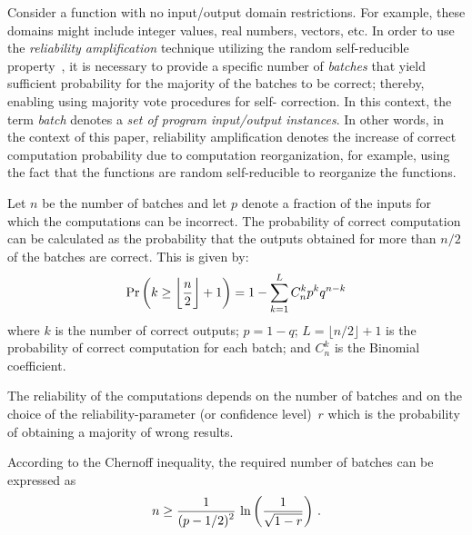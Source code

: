 \begin{multicols}{2}
     Consider a function with no input/output domain restrictions. For example, these domains might include integer 
values, real numbers, vectors, etc. In order to use the \textit{reliability amplification} technique 
utilizing the random 
self-reducible property~\cite{3-dol, 6-dol}, it is necessary to provide a specific number of 
\textit{batches} that yield sufficient 
probability for the majority of the batches to be correct; thereby, enabling using majority vote procedures for self-
correction. In this context, the term \textit{batch} denotes a
\textit{set of program input/output instances}.
In other words, in the context of this paper, reliability amplification denotes the increase of correct 
computation probability due to computation reorganization, for example, using the fact that the functions are random 
self-reducible to reorganize the functions.
       
       Let $n$ be the number of batches and let $p$ denote a fraction of the inputs for which the computations can be 
incorrect. The probability of correct computation can be calculated as the probability that the outputs obtained for more 
than $n/2$  of the batches are correct. This is given by:
       \begin{equation}
       \mathrm{Pr}\left( k\geq \left\lfloor \displaystyle\frac{\displaystyle n\mathstrut}{\displaystyle 2\mathstrut}\right\rfloor+1\right)=1-\sum\limits_{k=1}^L C_n^k p^k q^{n-k}
       \label{e1-dol}
       \end{equation}
where $k$ is the number of correct outputs; $p=1-q$; $L=\lfloor 
n/2\rfloor +1$ is the probability of correct computation for each batch; and
$C_n^k$ is the Binomial coefficient. 

   The reliability of the computations depends on the number of batches and on the 
   choice of the reliability-parameter (or confidence level)~$r$ which is the probability 
   of obtaining a majority of wrong results.  
     
   According to the Chernoff inequality, the required number of batches can be expressed as
   \begin{equation}
   n\geq \displaystyle\frac{\displaystyle 1\mathstrut}{\displaystyle (p-1/2)^2\mathstrut}\,\ln\left( \displaystyle\frac{\displaystyle 1\mathstrut}{\displaystyle \sqrt{1-r}\mathstrut}\right)\,.
   \label{e2-dol}
   \end{equation}
   

\end{multicols}
